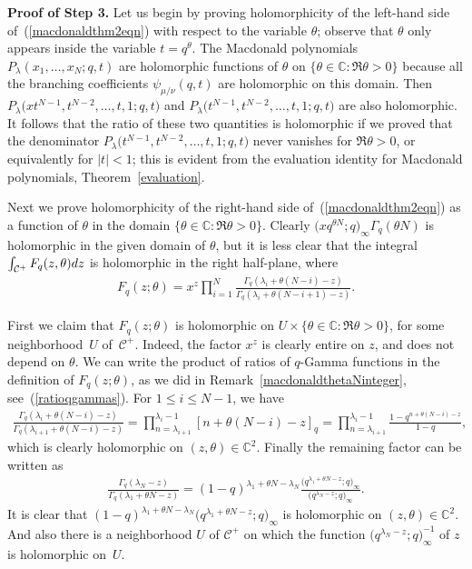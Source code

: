 \documentclass[11pt]{article}
\numberwithin{equation}{section}
\newcommand{\C}{\mathbb{C}}
\newcommand{\CC}{\mathcal{C}}
\begin{document}
\textbf{Proof of Step 3.} Let us begin by proving holomorphicity of the left-hand side of~(\ref{macdonaldthm2eqn}) with respect to the variable $\theta$; observe that $\theta$ only appears inside the variable $t = q^{\theta}$. The Macdonald polynomials $P_{\lambda}(x_1, \dots, x_N; q, t)$ are holomorphic functions of $\theta$ on $\{\theta\in\C\colon \Re\theta > 0\}$ because all the branching coef\/f\/icients $\psi_{\mu/\nu}(q, t)$ are holomorphic on this domain. Then $P_{\lambda}\big(xt^{N-1}, t^{N-2}, \dots, t, 1; q, t\big)$ and $P_{\lambda}\big(t^{N-1}, t^{N-2}, \dots, t, 1; q, t\big)$ are also holomorphic. It follows that the ratio of these two quantities is holomorphic if we proved that the denominator $P_{\lambda}\big(t^{N-1}, t^{N-2}, \dots, t, 1; q, t\big)$ never vanishes for $\Re\theta > 0$, or equivalently for $|t| < 1$; this is evident from the evaluation identity for Macdonald polynomials, Theorem~\ref{evaluation}.

Next we prove holomorphicity of the right-hand side of~(\ref{macdonaldthm2eqn}) as a function of $\theta$ in the domain $\{\theta\in\C\colon \Re\theta > 0\}$. Clearly $\big(xq^{\theta N}; q\big)_{\infty}\Gamma_q(\theta N)$ is holomorphic in the given domain of $\theta$, but it is less clear that the integral $\int_{\CC^+}{F_{q}(z, \theta){\rm d}z}$ is holomorphic in the right half-plane, where
\begin{gather*}
F_q(z; \theta) = x^z\prod\limits_{i=1}^N{\frac{\Gamma_q(\lambda_i + \theta(N-i) - z)}{\Gamma_q(\lambda_i + \theta(N-i+1) - z)}}.
\end{gather*}

First we claim that $F_q(z; \theta)$ is holomorphic on $U\times \{\theta\in\C\colon \Re\theta > 0\}$, for some neighborhood~$U$ of~$\CC^+$. Indeed, the factor $x^z$ is clearly entire on $z$, and does not depend on $\theta$. We can write the product of ratios of $q$-Gamma functions in the def\/inition of $F_q(z; \theta)$, as we did in Remark~\ref{macdonaldthetaNinteger}, see~(\ref{ratioqgammas}). For $1\leq i \leq N-1$, we have
\begin{gather*}
\frac{\Gamma_q(\lambda_i + \theta(N - i) - z)}{\Gamma_q(\lambda_{i+1} + \theta(N - i) - z)} =
\prod_{n = \lambda_{i+1}}^{\lambda_i - 1}{[n + \theta(N - i) - z]_q} =
\prod_{n = \lambda_{i+1}}^{\lambda_i - 1}{\frac{1 - q^{n + \theta(N - i) - z}}{1 - q}},
\end{gather*}
which is clearly holomorphic on $(z, \theta)\in\C^2$. Finally the remaining factor can be written as
\begin{gather*}
\frac{\Gamma_q(\lambda_N - z)}{\Gamma_q(\lambda_1 + \theta N - z)} = (1 - q)^{\lambda_1 + \theta N - \lambda_N}\frac{\big(q^{\lambda_1 + \theta N - z}; q\big)_{\infty}}{\big(q^{\lambda_N - z}; q\big)_{\infty}}.
\end{gather*}
It is clear that $(1 - q)^{\lambda_1 + \theta N - \lambda_N}\big(q^{\lambda_1 + \theta N - z}; q\big)_{\infty}$ is holomorphic on $(z, \theta)\in\C^2$. And also there is a neighborhood $U$ of $\CC^+$ on which the function $\big(q^{\lambda_N - z}; q\big)_{\infty}^{-1}$ of $z$ is holomorphic on~$U$.
\end{document}
